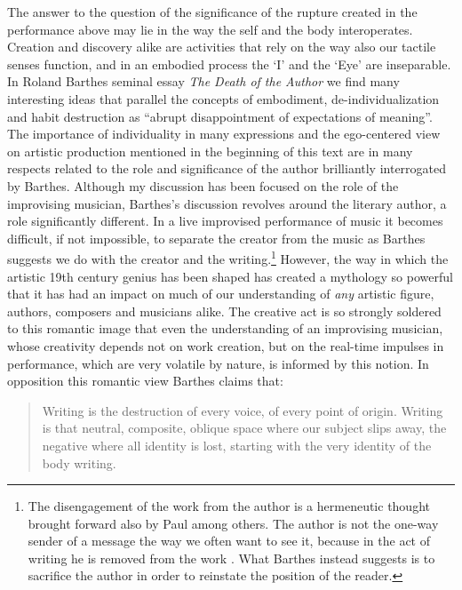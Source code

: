\documentclass[a4paper]{article}
\begin{document}
The answer to the question of the significance of the rupture created in the performance above may lie in the way the self and the body interoperates. Creation and discovery alike are activities that rely on the way also our tactile senses function, and in an embodied process the `I' and the `Eye' are inseparable. 
In Roland Barthes seminal essay \emph{The Death of the Author} we find many interesting ideas that parallel the concepts of embodiment, de-individualization and habit destruction as ``abrupt disappointment of expectations of meaning''\citep{barthes77}. The importance of individuality in many expressions and the ego-centered view on artistic production mentioned in the beginning of this text are in many respects related to the role and significance of the author brilliantly interrogated by Barthes. Although my discussion has been focused on the role of the improvising musician, Barthes's discussion revolves around the literary author, a role significantly different. In a live improvised performance of music it becomes difficult, if not impossible, to separate the creator from the music as Barthes suggests we do with the creator and the writing.\footnote{The disengagement of the work from the author is a hermeneutic thought brought forward also by Paul \citet{ric91} among others. The author is not the one-way sender of a message the way we often want to see it, because in the act of writing he is removed from the work \citep[See also][]{frisk-ost06-2}. What Barthes instead suggests is to sacrifice the author in order to reinstate the position of the reader.} However, the way in which the artistic 19th century genius has been shaped has created a mythology so powerful that it has had an impact on much of our understanding of \emph{any} artistic figure, authors, composers and musicians alike. The creative act is so strongly soldered to this romantic image that even the understanding of an improvising musician, whose creativity depends not on work creation, but on the real-time impulses in performance, which are very volatile by nature, is informed by this notion. In opposition this romantic view Barthes claims that:

\begin{quote}
Writing is the destruction of every voice, of every point of origin. Writing is that neutral, composite, oblique space where our subject slips away, the negative where all identity is lost, starting with the very identity of the body writing. \citep[p. 142]{barthes77}
\end{quote}
\end{document}
